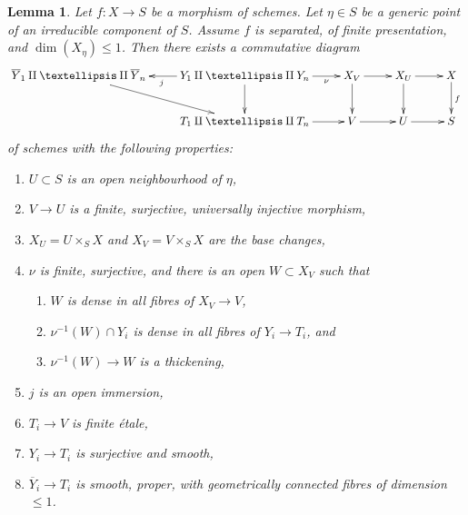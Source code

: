 \documentclass{amsart}
\theoremstyle{plain}
\newtheorem{lemma}[subsection]{Lemma}
\theoremstyle{definition}
\theoremstyle{remark}
\numberwithin{equation}{subsection}
\begin{document}
\begin{lemma}
\label{lemma-make-good-curves}
Let $f : X \to S$ be a morphism of schemes. Let $\eta \in S$ be a
generic point of an irreducible component of $S$. Assume $f$ is
separated, of finite presentation, and $\dim(X_\eta) \leq 1$.
Then there exists a commutative diagram
$$
\xymatrix{
\overline{Y}_1 \amalg \ldots \amalg \overline{Y}_n \ar[rd] &
Y_1 \amalg \ldots \amalg Y_n \ar[r]_-\nu \ar[d] \ar[l]^j &
X_V \ar[r] \ar[d] &
X_U \ar[r] \ar[d] &
X \ar[d]^f \\
& T_1 \amalg \ldots \amalg T_n \ar[r] &
V \ar[r] &
U \ar[r] &
S
}
$$
of schemes with the following properties:
\begin{enumerate}
\item $U \subset S$ is an open neighbourhood of $\eta$,
\item $V \to U$ is a finite, surjective, universally injective morphism,
\item $X_U = U \times_S X$ and $X_V = V \times_S X$ are the base changes,
\item $\nu$ is finite, surjective, and there is an open $W \subset X_V$
such that
\begin{enumerate}
\item $W$ is dense in all fibres of $X_V \to V$,
\item $\nu^{-1}(W) \cap Y_i$ is dense in all fibres of $Y_i \to T_i$, and
\item $\nu^{-1}(W) \to W$ is a thickening,
\end{enumerate}
\item $j$ is an open immersion,
\item $T_i \to V$ is finite \'etale,
\item $Y_i \to T_i$ is surjective and smooth,
\item $\overline{Y}_i \to T_i$ is smooth, proper, with geometrically
connected fibres of dimension $\leq 1$.
\end{enumerate}
\end{lemma}
\end{document}
